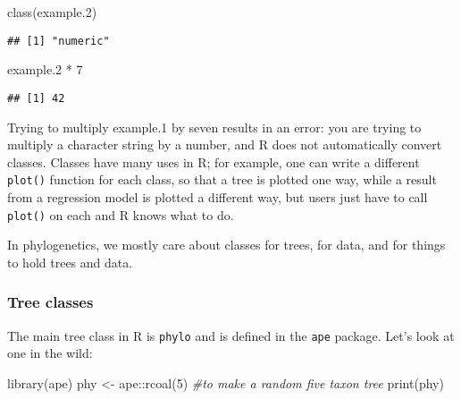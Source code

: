 \documentclass[
]{article}
\newenvironment{Shaded}{\begin{snugshade}}{\end{snugshade}}
\newcommand{\CommentTok}[1]{\textcolor[rgb]{0.56,0.35,0.01}{\textit{#1}}}
\newcommand{\DecValTok}[1]{\textcolor[rgb]{0.00,0.00,0.81}{#1}}
\newcommand{\FloatTok}[1]{\textcolor[rgb]{0.00,0.00,0.81}{#1}}
\newcommand{\FunctionTok}[1]{\textcolor[rgb]{0.00,0.00,0.00}{#1}}
\newcommand{\NormalTok}[1]{#1}
\newcommand{\OtherTok}[1]{\textcolor[rgb]{0.56,0.35,0.01}{#1}}
\newcommand{\SpecialCharTok}[1]{\textcolor[rgb]{0.00,0.00,0.00}{#1}}
\begin{document}
\begin{Shaded}
\begin{Highlighting}[]
\FunctionTok{class}\NormalTok{(example}\FloatTok{.2}\NormalTok{)}
\end{Highlighting}
\end{Shaded}

\begin{verbatim}
## [1] "numeric"
\end{verbatim}

\begin{Shaded}
\begin{Highlighting}[]
\NormalTok{example}\FloatTok{.2} \SpecialCharTok{*} \DecValTok{7}
\end{Highlighting}
\end{Shaded}

\begin{verbatim}
## [1] 42
\end{verbatim}

Trying to multiply example.1 by seven results in an error: you are trying to multiply a character string by a number, and R does not automatically convert classes. Classes have many uses in R; for example, one can write a different \texttt{plot()} function for each class, so that a tree is plotted one way, while a result from a regression model is plotted a different way, but users just have to call \texttt{plot()} on each and R knows what to do.

In phylogenetics, we mostly care about classes for trees, for data, and for things to hold trees and data.

\hypertarget{tree-classes}{%
\subsubsection{Tree classes}\label{tree-classes}}

The main tree class in R is \texttt{phylo} and is defined in the \texttt{ape} package. Let's look at one in the wild:

\begin{Shaded}
\begin{Highlighting}[]
\FunctionTok{library}\NormalTok{(ape)}
\NormalTok{phy }\OtherTok{\textless{}{-}}\NormalTok{ ape}\SpecialCharTok{::}\FunctionTok{rcoal}\NormalTok{(}\DecValTok{5}\NormalTok{) }\CommentTok{\#to make a random five taxon tree}
\FunctionTok{print}\NormalTok{(phy)}
\end{Highlighting}
\end{Shaded}
\end{document}
